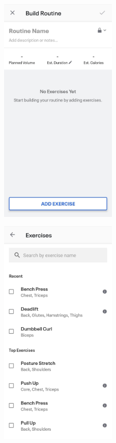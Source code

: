 \begin{figure}[H]
    \begin{minipage}{0.5\textwidth}
        \centering
        \includegraphics[width=0.5\textwidth]{myfitnesspal/exercise-routines.jpeg}
        \label{fig:mfp-workouts}
    \end{minipage}%
    \begin{minipage}{0.5\textwidth}
        \centering
        \includegraphics[width=0.5\textwidth]{myfitnesspal/exercise-choice.jpeg}
        \label{fig:mfp-exercise-picker}
    \end{minipage}
    \label{fig:mfp-screens}
\end{figure}